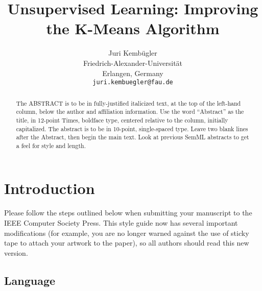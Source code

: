 \documentclass[10pt,twocolumn,letterpaper]{article}
\begin{document}
\title{Unsupervised Learning: Improving the K-Means Algorithm}

\author{Juri Kembügler\\
Friedrich-Alexander-Universität\\
Erlangen, Germany\\
{\tt\small juri.kembuegler@fau.de}
}

\maketitle

\begin{abstract}
   The ABSTRACT is to be in fully-justified italicized text, at the top
   of the left-hand column, below the author and affiliation
   information. Use the word ``Abstract'' as the title, in 12-point
   Times, boldface type, centered relative to the column, initially
   capitalized. The abstract is to be in 10-point, single-spaced type.
   Leave two blank lines after the Abstract, then begin the main text.
   Look at previous SemML abstracts to get a feel for style and length.
\end{abstract}

\section{Introduction}

Please follow the steps outlined below when submitting your manuscript to
the IEEE Computer Society Press.  This style guide now has several
important modifications (for example, you are no longer warned against the
use of sticky tape to attach your artwork to the paper), so all authors
should read this new version.

\subsection{Language}
\end{document}
